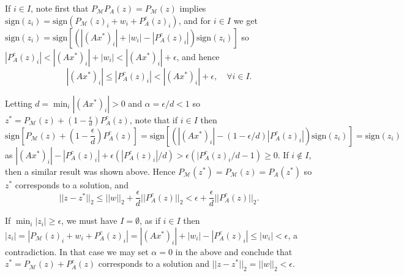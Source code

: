 \documentclass[12pt]{article}
\theoremstyle{definition}
\theoremstyle{remark}
\theoremstyle{definition}
\theoremstyle{problem}
\theoremstyle{definition}
\newcommand{\sign}{\text{sign}}
\newcommand{\MM}{\mathcal{M}}
\begin{document}
If $i\in I$, note first that $P_{\MM}P_A(z) = P_{\MM}(z)$ implies $\sign(z_i) = \sign(P_{\MM}(z)_i+w_i+P_A^c(z)_i)$, and for $i\in I$ we get $\sign(z_i) = \sign\left[(|(Ax^*)_i| + |w_i| - |P_A^c(z)_i|)\sign(z_i)\right]$ so $|P_A^c(z)_i|<|(Ax^*)_i| + |w_i|< |(Ax^*)_i| + \epsilon$, and hence
\[|(Ax^*)_i|\leq |P_A^c(z)_i|<|(Ax^*)_i| + \epsilon,\quad \forall i\in I.\]

Letting $d = \min_i|(Ax^*)_i| > 0$ and $\alpha = \epsilon/d<1$ so $z^* = P_{\MM}(z) + (1-\frac{\epsilon}{d})P_A^c(z)$, note that if $i\in I$ then
\[\sign\left[P_{\MM}(z) + (1-\frac{\epsilon}{d})P_A^c(z)\right] = \sign\left[(|(Ax^*)_i|-(1-\epsilon/d)|P_A^c(z)_i|)\sign(z_i)\right] = \sign(z_i)\]
as $|(Ax^*)_i|-|P_A^c(z)_i|+\epsilon(|P_A^c(z)_i|/d)>\epsilon\left(|P_A^c(z)_i/d - 1\right) \geq 0$. If $i\notin I$, then a similar result was shown above. Hence $P_{\MM}(z^*)=P_{\MM}(z) = P_A(z^*)$ so $z^*$ corresponds to a solution, and
\[||z-z^*||_2 \leq ||w||_2 + \frac{\epsilon}{d}||P_A^c(z)||_2 < \epsilon + \frac{\epsilon}{d}||P_A^c(z)||_2.\]

If $\min_i|z_i|\geq\epsilon$, we must have $I=\emptyset$, as if $i\in I$ then $|z_i| = |P_{\MM}(z)_i+w_i+P_A^c(z)_i|=|(Ax^*)_i| + |w_i| - |P_A^c(z)_i|\leq |w_i|<\epsilon$, a contradiction. In that case we may set $\alpha=0$ in the above and conclude that $z^* = P_{\MM}(z) + P_A^c(z)$ corresponds to a solution and $||z-z^*||_2 = ||w||_2<\epsilon$. 
\end{document}
